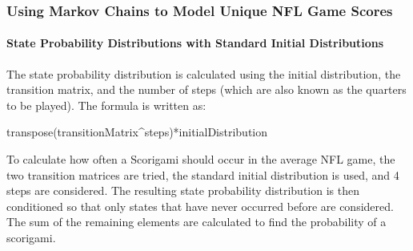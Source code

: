 \documentclass[
]{article}
\let\oldparagraph\paragraph
\renewcommand{\paragraph}[1]{\oldparagraph{#1}\mbox{}}
\begin{document}
\hypertarget{using-markov-chains-to-model-unique-nfl-game-scores}{%
\subsubsection{Using Markov Chains to Model Unique NFL Game
Scores}\label{using-markov-chains-to-model-unique-nfl-game-scores}}

\hypertarget{state-probability-distributions-with-standard-initial-distributions}{%
\paragraph{State Probability Distributions with Standard Initial
Distributions}\label{state-probability-distributions-with-standard-initial-distributions}}

The state probability distribution is calculated using the initial
distribution, the transition matrix, and the number of steps (which are
also known as the quarters to be played). The formula is written as:

transpose(transitionMatrix\^{}steps)*initialDistribution

To calculate how often a Scorigami should occur in the average NFL game,
the two transition matrices are tried, the standard initial distribution
is used, and 4 steps are considered. The resulting state probability
distribution is then conditioned so that only states that have never
occurred before are considered. The sum of the remaining elements are
calculated to find the probability of a scorigami.
\end{document}
